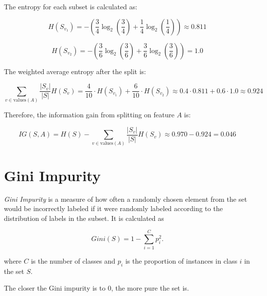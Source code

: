 The entropy for each subset is calculated as:

\[
    H(S_{v_1}) = -\left(\frac{3}{4} \log_2 \left(\frac{3}{4}\right) + \frac{1}{4} \log_2 \left(\frac{1}{4}\right)\right) \approx 0.811
\]

\[
    H(S_{v_2}) = -\left(\frac{3}{6} \log_2 \left(\frac{3}{6}\right) + \frac{3}{6} \log_2 \left(\frac{3}{6}\right)\right) = 1.0    
\]  

The weighted average entropy after the split is:

\[
    \sum_{v \in \text{values}(A)} \frac{|S_v|}{|S|} H(S_v) = \frac{4}{10} \cdot H(S_{v_1}) + \frac{6}{10} \cdot H(S_{v_2}) \approx 0.4 \cdot 0.811 + 0.6 \cdot 1.0 \approx 0.924
\]

Therefore, the information gain from splitting on feature \(A\) is:

\[
    IG(S, A) = H(S) - \sum_{v \in \text{values}(A)} \frac{|S_v|}{|S|} H(S_v) \approx 0.970 - 0.924 = 0.046
\]  

\section{Gini Impurity}

\emph{Gini Impurity} is a measure of how often a randomly chosen element from the set would be incorrectly labeled if it were randomly 
labeled according to the distribution of labels in the subset. It is calculated as

\[
    Gini(S) = 1 - \sum_{i=1}^{C} p_i^2.
\]

where \(C\) is the number of classes and \(p_i\) is the proportion of instances in class \(i\) in the set \(S\).

The closer the Gini impurity is to 0, the more pure the set is.



